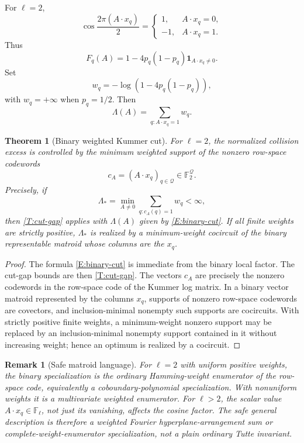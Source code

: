 \documentclass[11pt]{article}
\newtheorem{theorem}{Theorem}
\newtheorem{remark}{Remark}
\newcommand{\F}{\mathbb F}
\newcommand{\one}{\mathbf 1}
\begin{document}
For \(\ell=2\),
\[
\cos\frac{2\pi(A\cdot x_q)}{2}
=
\begin{cases}
1,& A\cdot x_q=0,\\
-1,& A\cdot x_q=1.
\end{cases}
\]
Thus
\[
F_q(A)=
1-4p_q(1-p_q)\one_{A\cdot x_q\ne0}.
\]
Set
\[
w_q=-\log(1-4p_q(1-p_q)),
\]
with \(w_q=+\infty\) when \(p_q=1/2\).  Then
\begin{equation}\label{E:binary-cut}
\Lambda(A)=\sum_{q:A\cdot x_q=1}w_q.
\end{equation}

\begin{theorem}[Binary weighted Kummer cut]\label{T:binary}
For \(\ell=2\), the normalized collision excess is controlled by the minimum weighted support of the nonzero row-space codewords
\[
c_A=(A\cdot x_q)_{q\in\mathcal Q}\in\F_2^{\mathcal Q}.
\]
Precisely, if
\[
\Lambda_*=\min_{A\ne0}\sum_{q:c_A(q)=1}w_q<\infty,
\]
then \cref{T:cut-gap} applies with \(\Lambda(A)\) given by \eqref{E:binary-cut}.  If all finite weights are strictly positive, \(\Lambda_*\) is realized by a minimum-weight cocircuit of the binary representable matroid whose columns are the \(x_q\).
\end{theorem}

\begin{proof}
The formula \eqref{E:binary-cut} is immediate from the binary local factor.  The cut-gap bounds are then \cref{T:cut-gap}.  The vectors \(c_A\) are precisely the nonzero codewords in the row-space code of the Kummer log matrix.  In a binary vector matroid represented by the columns \(x_q\), supports of nonzero row-space codewords are covectors, and inclusion-minimal nonempty such supports are cocircuits.  With strictly positive finite weights, a minimum-weight nonzero support may be replaced by an inclusion-minimal nonempty support contained in it without increasing weight; hence an optimum is realized by a cocircuit.
\end{proof}

\begin{remark}[Safe matroid language]
For \(\ell=2\) with uniform positive weights, the binary specialization is the ordinary Hamming-weight enumerator of the row-space code, equivalently a coboundary-polynomial specialization.  With nonuniform weights it is a multivariate weighted enumerator.  For \(\ell>2\), the scalar value \(A\cdot x_q\in\F_\ell\), not just its vanishing, affects the cosine factor.  The safe general description is therefore a weighted Fourier hyperplane-arrangement sum or complete-weight-enumerator specialization, not a plain ordinary Tutte invariant.
\end{remark}
\end{document}
